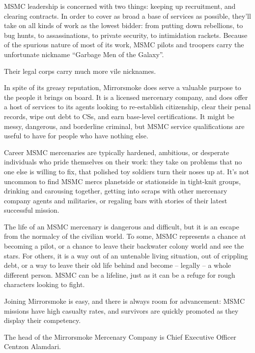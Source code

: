 MSMC leadership is concerned with two things: keeping up recruitment, and clearing contracts.
In order to cover as broad a base of services as possible, they’ll take on all kinds of work as the
lowest bidder: from putting down rebellions, to bug hunts, to assassinations, to private security,
to intimidation rackets. Because of the spurious nature of most of its work, MSMC pilots and
troopers carry the unfortunate nickname “Garbage Men of the Galaxy”.


Their legal corps carry much more vile nicknames.


In spite of its greasy reputation, Mirrorsmoke does serve a valuable purpose to the people it
brings on board. It is a licensed mercenary company, and does offer a host of services to its
agents looking to re-establish citizenship, clear their penal records, wipe out debt to CSs, and
earn base-level certifications. It might be messy, dangerous, and borderline criminal, but MSMC
service qualifications are useful to have for people who have nothing else.


Career MSMC mercenaries are typically hardened, ambitious, or desperate individuals who pride
themselves on their work: they take on problems that no one else is willing to fix, that polished
toy soldiers turn their noses up at. It’s not uncommon to find MSMC mercs planetside or
stationside in tight-knit groups, drinking and carousing together, getting into scraps with other
mercenary company agents and militaries, or regaling bars with stories of their latest successful
mission.


The life of an MSMC mercenary is dangerous and difficult, but it is an escape from the normalcy
of the civilian world. To some, MSMC represents a chance at becoming a pilot, or a chance to
leave their backwater colony world and see the stars. For others, it is a way out of an untenable
living situation, out of crippling debt, or a way to leave their old life behind and become -- legally
-- a whole different person. MSMC can be a lifeline, just as it can be a refuge for rough
characters looking to fight.





Joining Mirrorsmoke is easy, and there is always room for advancement: MSMC missions have
high casualty rates, and survivors are quickly promoted as they display their competency.


The head of the Mirrorsmoke Mercenary Company is Chief Executive Officer Centzon Alamdari.


